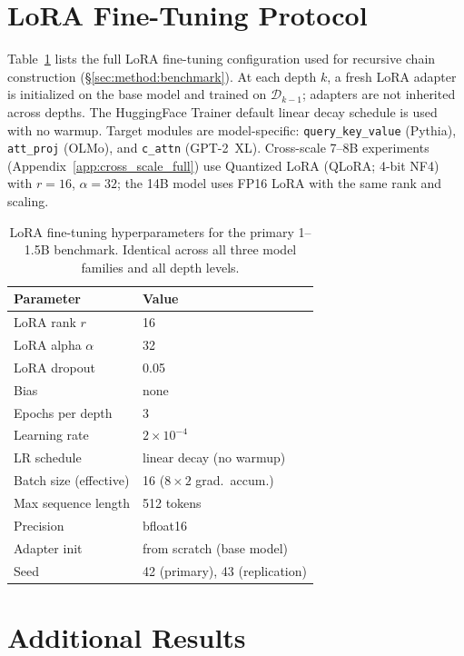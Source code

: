 \section{LoRA Fine-Tuning Protocol}
\label{app:lora_protocol}

Table~\ref{tab:lora_protocol} lists the full LoRA fine-tuning configuration used for recursive chain construction (\S\ref{sec:method:benchmark}).
At each depth $k$, a fresh LoRA adapter is initialized on the base model and trained on $\mathcal{D}_{k-1}$; adapters are not inherited across depths.
The HuggingFace Trainer default linear decay schedule is used with no warmup.
Target modules are model-specific: \texttt{query\_key\_value} (Pythia), \texttt{att\_proj} (OLMo), and \texttt{c\_attn} (GPT-2~XL).
Cross-scale 7--8B experiments (Appendix~\ref{app:cross_scale_full}) use Quantized LoRA (QLoRA; 4-bit NF4) with $r{=}16$, $\alpha{=}32$; the 14B model uses FP16 LoRA with the same rank and scaling.

\begin{table}[h]
\centering
\small
\caption{LoRA fine-tuning hyperparameters for the primary 1--1.5B benchmark. Identical across all three model families and all depth levels.}
\label{tab:lora_protocol}
\begin{tabular}{@{}ll@{}}
\toprule
Parameter & Value \\
\midrule
LoRA rank $r$ & 16 \\
LoRA alpha $\alpha$ & 32 \\
LoRA dropout & 0.05 \\
Bias & none \\
Epochs per depth & 3 \\
Learning rate & $2 \times 10^{-4}$ \\
LR schedule & linear decay (no warmup) \\
Batch size (effective) & 16 ($8 \times 2$ grad.\ accum.) \\
Max sequence length & 512 tokens \\
Precision & bfloat16 \\
Adapter init & from scratch (base model) \\
Seed & 42 (primary), 43 (replication) \\
\bottomrule
\end{tabular}
\end{table}

\section{Additional Results}
\label{app:additional}

